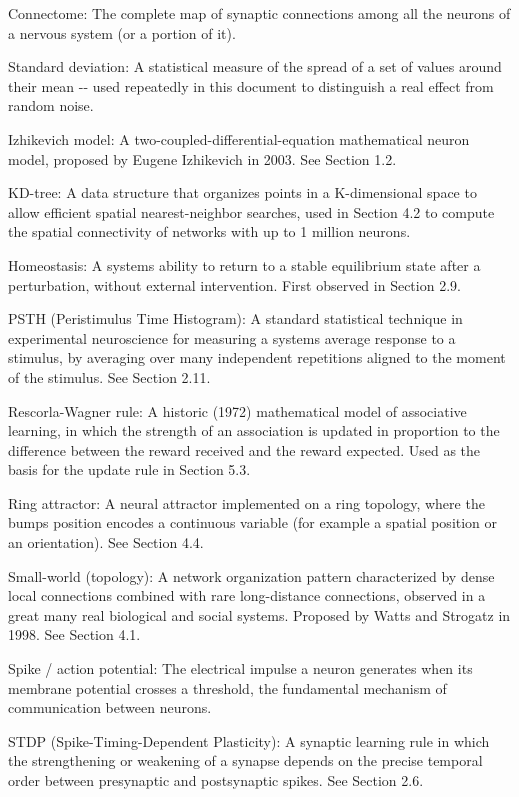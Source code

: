 \documentclass[
  english,
]{article}
\begin{document}
Connectome: The complete map of synaptic connections among all the neurons of a nervous system (or a portion of it).

Standard deviation: A statistical measure of the spread of a set of values around their mean -\/- used repeatedly in this document to distinguish a real effect from random noise.

Izhikevich model: A two-coupled-differential-equation mathematical neuron model, proposed by Eugene Izhikevich in 2003. See Section 1.2.

KD-tree: A data structure that organizes points in a K-dimensional space to allow efficient spatial nearest-neighbor searches, used in Section 4.2 to compute the spatial connectivity of networks with up to 1 million neurons.

Homeostasis: A system\textquotesingle s ability to return to a stable equilibrium state after a perturbation, without external intervention. First observed in Section 2.9.

PSTH (Peristimulus Time Histogram): A standard statistical technique in experimental neuroscience for measuring a system\textquotesingle s average response to a stimulus, by averaging over many independent repetitions aligned to the moment of the stimulus. See Section 2.11.

Rescorla-Wagner rule: A historic (1972) mathematical model of associative learning, in which the strength of an association is updated in proportion to the difference between the reward received and the reward expected. Used as the basis for the update rule in Section 5.3.

Ring attractor: A neural attractor implemented on a ring topology, where the bump\textquotesingle s position encodes a continuous variable (for example a spatial position or an orientation). See Section 4.4.

Small-world (topology): A network organization pattern characterized by dense local connections combined with rare long-distance connections, observed in a great many real biological and social systems. Proposed by Watts and Strogatz in 1998. See Section 4.1.

Spike / action potential: The electrical impulse a neuron generates when its membrane potential crosses a threshold, the fundamental mechanism of communication between neurons.

STDP (Spike-Timing-Dependent Plasticity): A synaptic learning rule in which the strengthening or weakening of a synapse depends on the precise temporal order between presynaptic and postsynaptic spikes. See Section 2.6.
\end{document}
